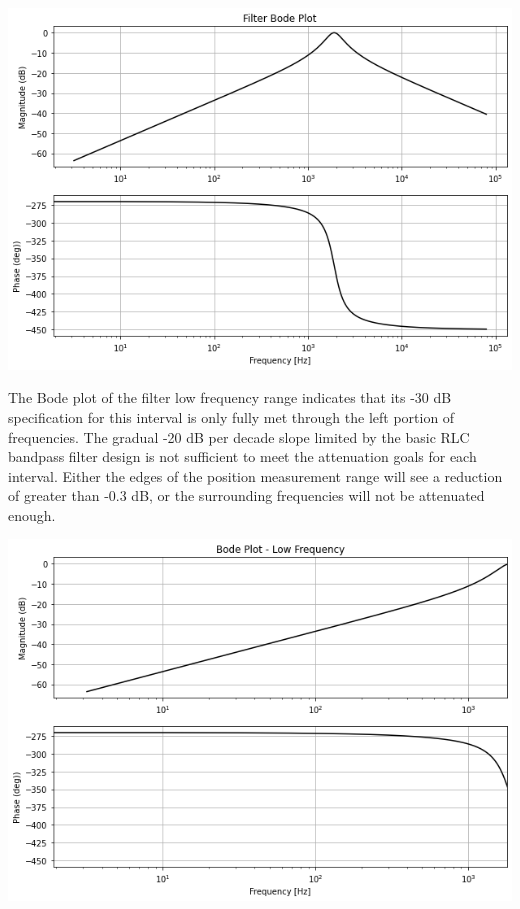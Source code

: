\documentclass[12pt]{report}
\begin{document}
\begin{center}
	\includegraphics[scale = 0.5]{Lab 12 - Plots/Filter Bode Plot.png}\\[1.0 cm]
\end{center}

The Bode plot of the filter low frequency range indicates that its -30 dB specification for this interval is only fully met through the left portion of frequencies. The gradual -20 dB per decade slope limited by the basic RLC bandpass filter design is not sufficient to meet the attenuation goals for each interval. Either the edges of the position measurement range will see a reduction of greater than -0.3 dB, or the surrounding frequencies will not be attenuated enough. \\

\begin{center}
	\includegraphics[scale = 0.5]{Lab 12 - Plots/Bode1.png}\\[1.0 cm]
\end{center}
\end{document}
